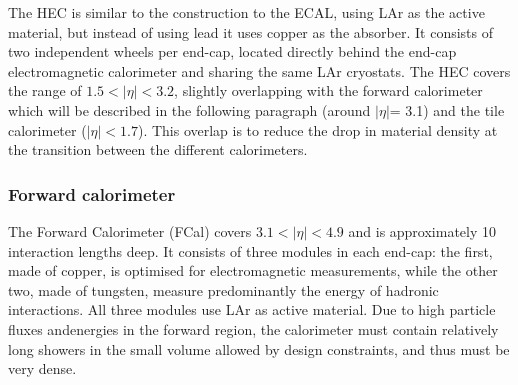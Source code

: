 	The HEC is similar to the construction to the ECAL, using LAr as the 
	active material, but instead of using lead it uses copper as the absorber.
	It consists of two independent wheels per end-cap, located directly 
	behind the end-cap electromagnetic calorimeter and sharing the same LAr cryostats. 
	The HEC covers the range of $1.5< |\eta|< 3.2$, 
	slightly overlapping with the forward calorimeter which 
	will be described in the following paragraph 
	(around $|\eta|$= 3.1) and the tile calorimeter ($|\eta|< 1.7$).
	This overlap is to reduce the drop in material density at the transition between
	the different calorimeters.
	\subsubsection{Forward calorimeter}
	The Forward Calorimeter (FCal) covers $3.1 < |\eta| < 4.9 $ and
	is approximately 10 interaction lengths deep. 
	It consists of three modules in each end-cap: 
	the first, made of copper, is optimised for	electromagnetic measurements, 
	while the other two, made of tungsten, measure predominantly the
	energy of hadronic interactions. All three modules use LAr as active material.
	Due to high particle fluxes andenergies in the forward region, 
	the calorimeter must contain relatively long showers 
	in the small volume allowed by design constraints, 
	and thus must be very dense.



